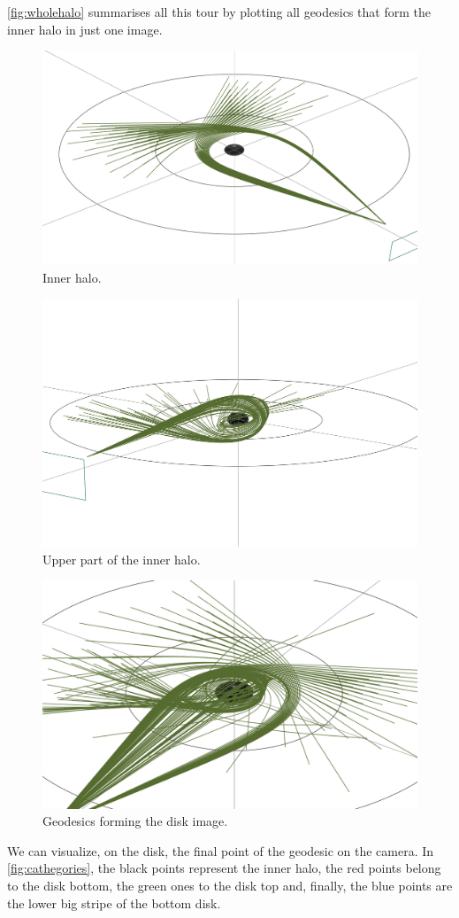 \autoref{fig:wholehalo} summarises all this tour by plotting all geodesics that form the inner halo in just one image.

\begin{figure}[bth]
	\myfloatalign
	\includegraphics[width=.6\linewidth]{gfx/disk_inside_halo}
	\caption[Inner halo]{Inner halo.}
	\label{fig:insidehalo}
\end{figure}

\begin{figure}[bth]
	\myfloatalign
	\includegraphics[width=.6\linewidth]{gfx/disk_inside_halo_superior}
	\caption[Upper part of the inner halo]{Upper part of the inner halo.}
	\label{fig:upperhalo}
\end{figure}

\begin{figure}[bth]
	\myfloatalign
	\includegraphics[width=.5\linewidth]{gfx/halo_entero}
	\caption[Geodesics forming the disk image]{Geodesics forming the disk image.}
	\label{fig:wholehalo}
\end{figure}

We can visualize, on the disk, the final point of the geodesic on the camera. In \autoref{fig:cathegories}, the black points represent the inner halo, the red points belong to the disk bottom, the green ones to the disk top and, finally, the blue points are the lower big stripe of the bottom disk.

